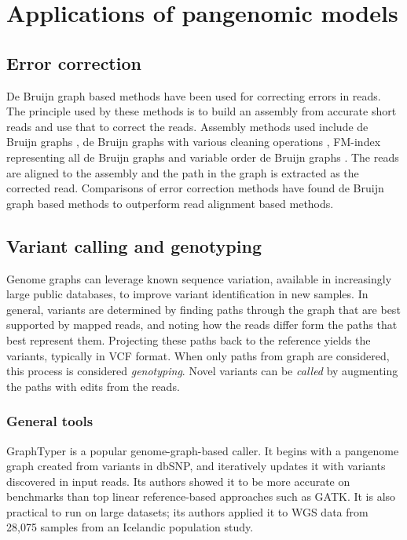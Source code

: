 \section{Applications of pangenomic models}

\subsection{Error correction}

De Bruijn graph based methods have been used for correcting errors in reads.
The principle used by these methods is to build an assembly from accurate short reads and use that to correct the reads.
Assembly methods used include de Bruijn graphs \cite{Salmela2014LoRDEC, Salmela2016LORMA}, de Bruijn graphs with various cleaning operations \cite{Miclotte2016Jabba, Limasset_2019, Rautiainen_2019b, Marchet_2019}, FM-index representing all de Bruijn graphs \cite{Wang2018FMLRC} and variable order de Bruijn graphs \cite{Morisse2018HGcolor, Morisse2019Consent}.
The reads are aligned to the assembly and the path in the graph is extracted as the corrected read.
Comparisons of error correction methods \cite{Fu2019ErrorCorrectionSurvey, Zhang2019ErrorCorrectionSurvey} have found de Bruijn graph based methods to outperform read alignment based methods.

\subsection{Variant calling and genotyping}

Genome graphs can leverage known sequence variation, available in increasingly large public databases, to improve variant identification in new samples.
In general, variants are determined by finding paths through the graph that are best supported by mapped reads, and noting how the reads differ form the paths that best represent them.
Projecting these paths back to the reference yields the variants, typically in VCF format.
When only paths from graph are considered, this process is considered \emph{genotyping}.
Novel variants can be \emph{called} by augmenting the paths with edits from the reads.

\subsubsection{General tools}

GraphTyper \cite{eggertsson2017graphtyper} is a popular genome-graph-based caller.
It begins with a pangenome graph created from variants in dbSNP, and iteratively updates it with variants discovered in input reads.
Its authors showed it to be more accurate on benchmarks than top linear reference-based approaches such as GATK.
It is also practical to run on large datasets; its authors applied it to WGS data from 28,075 samples from an Icelandic population study.

